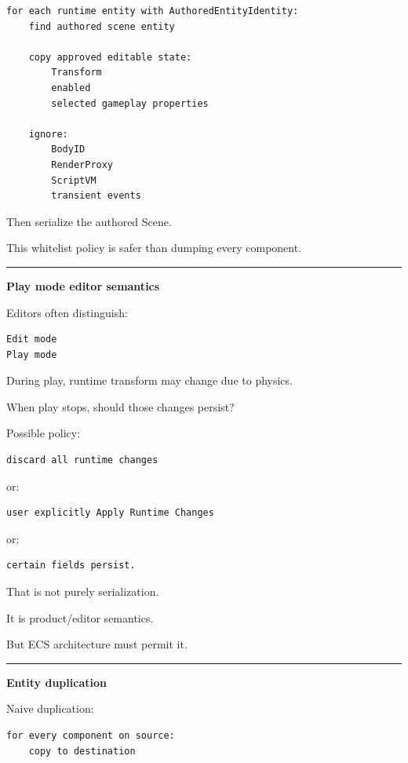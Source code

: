 \begin{verbatim}
for each runtime entity with AuthoredEntityIdentity:
    find authored scene entity

    copy approved editable state:
        Transform
        enabled
        selected gameplay properties

    ignore:
        BodyID
        RenderProxy
        ScriptVM
        transient events
\end{verbatim}

Then serialize the authored Scene.

This whitelist policy is safer than dumping every component.

\begin{center}\rule{0.5\linewidth}{0.5pt}\end{center}

\textbf{Play mode editor semantics}

Editors often distinguish:

\begin{verbatim}
Edit mode
Play mode
\end{verbatim}

During play, runtime transform may change due to physics.

When play stops, should those changes persist?

Possible policy:

\begin{verbatim}
discard all runtime changes
\end{verbatim}

or:

\begin{verbatim}
user explicitly Apply Runtime Changes
\end{verbatim}

or:

\begin{verbatim}
certain fields persist.
\end{verbatim}

That is not purely serialization.

It is product/editor semantics.

But ECS architecture must permit it.

\begin{center}\rule{0.5\linewidth}{0.5pt}\end{center}

\textbf{Entity duplication}

Naive duplication:

\begin{verbatim}
for every component on source:
    copy to destination
\end{verbatim}

